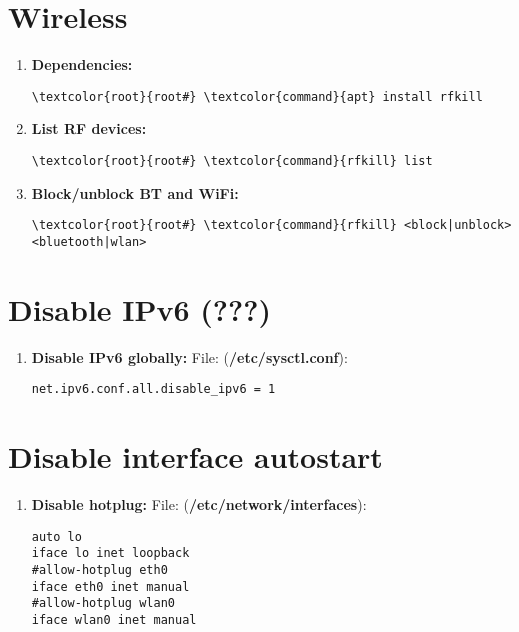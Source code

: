 \documentclass[10pt, a4paper, onecolumn, openany]{book} %
\begin{document}
\section{Wireless}
\begin{enumerate}
    \item \textbf{Dependencies:}
\begin{Verbatim}[commandchars=\\\{\}]
\textcolor{root}{root#} \textcolor{command}{apt} install rfkill
\end{Verbatim}
    \item \textbf{List RF devices:}
\begin{Verbatim}[commandchars=\\\{\}]
\textcolor{root}{root#} \textcolor{command}{rfkill} list
\end{Verbatim}
    \item \textbf{Block/unblock BT and WiFi:}
\begin{Verbatim}[commandchars=\\\{\}]
\textcolor{root}{root#} \textcolor{command}{rfkill} <block|unblock> <bluetooth|wlan>
\end{Verbatim}
\end{enumerate}
\section{Disable IPv6 (???)}
\begin{enumerate}
    \item \textbf{Disable IPv6 globally:}
\newline File: (\textcolor{file}{\textbf{/etc/sysctl.conf}}):
\begin{Verbatim}[commandchars=\\\{\}]
net.ipv6.conf.all.disable_ipv6 = 1
\end{Verbatim}
\end{enumerate}
\section{Disable interface autostart}
\begin{enumerate}
    \item \textbf{Disable hotplug:}
\newline File: (\textbf{\textcolor{file}{/etc/network/interfaces}}):
\begin{Verbatim}[commandchars=\\\{\}]
auto lo
iface lo inet loopback
#allow-hotplug eth0
iface eth0 inet manual
#allow-hotplug wlan0
iface wlan0 inet manual
\end{Verbatim}
\end{enumerate}
\end{document}
